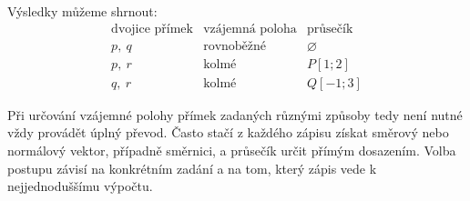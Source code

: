 \begin{example}
\begin{enumerate}[label=\alph*), leftmargin=2em]
    \end{enumerate}

    Výsledky můžeme shrnout:
    \[
    \begin{array}{c|c|c}
        \text{dvojice přímek}
        &
        \text{vzájemná poloha}
        &
        \text{průsečík}
        \\
        \hline
        p,\ q
        &
        \text{rovnoběžné}
        &
        \varnothing
        \\[1mm]
        p,\ r
        &
        \text{kolmé}
        &
        P[1;2]
        \\[1mm]
        q,\ r
        &
        \text{kolmé}
        &
        Q[-1;3]
    \end{array}
    \]
\end{example}

Při určování vzájemné polohy přímek zadaných různými způsoby tedy není
nutné vždy provádět úplný převod. Často stačí z každého zápisu získat
směrový nebo normálový vektor, případně směrnici, a průsečík určit
přímým dosazením. Volba postupu závisí na konkrétním zadání a na tom,
který zápis vede k nejjednoduššímu výpočtu.
